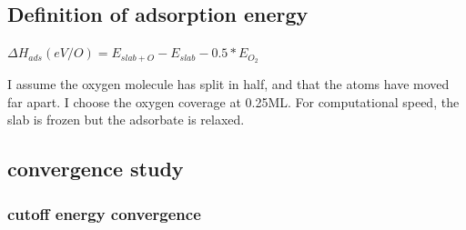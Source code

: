 \documentclass[11pt]{article}
\begin{document}
\subsection{Definition of adsorption energy}
\label{sec-3-1}


$\Delta H_{ads} (eV/O) = E_{slab+O} - E_{slab} - 0.5*E_{O_2}$

I assume the oxygen molecule has split in half, and that the atoms have moved far apart. I choose the oxygen coverage at 0.25ML. For computational speed, the slab is frozen but the adsorbate is relaxed.
\subsection{convergence study}
\label{sec-3-2}
\subsubsection{cutoff energy convergence}
\label{sec-3-2-1}
\end{document}
